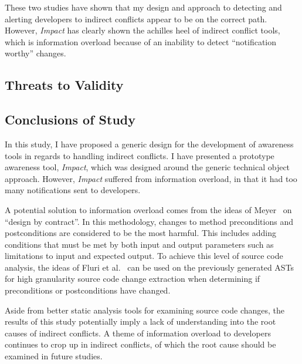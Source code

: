 These two studies have shown that my design and approach to
detecting and alerting developers to indirect conflicts appear
to be on the correct path. However, \textit{Impact} has clearly shown
the achilles heel of indirect conflict tools, which is information
overload because of an inability to detect ``notification worthy''
changes.

\subsection{Threats to Validity}

\subsection{Conclusions of Study}
\label{sec:ns}
In this study, I have proposed a generic 
design for the development of awareness tools in regards to
handling indirect conflicts. I have presented a prototype 
awareness tool, \textit{Impact}, which was designed around the generic 
technical object approach. However, \textit{Impact} suffered from
information overload, in that it had too many notifications sent to
developers.

A potential solution to information overload comes from the ideas of
Meyer~\cite{Meyer:1988} on ``design by contract''. In this methodology, changes to method
preconditions and postconditions are considered to be the most harmful. 
This includes adding conditions that must be met by both input
and output parameters such as limitations to input and expected
output. To achieve this level of source code analysis, the ideas of
Fluri et al.~\cite{Fluri:2007:CDT} can be used on the previously generated
ASTs for high granularity
source code change extraction when determining if preconditions or
postconditions have changed.

Aside from better static analysis tools for examining source code changes,
the results of this study potentially imply a lack of understanding into the
root causes of indirect conflicts.  A theme of information overload to developers
continues to crop up in indirect conflicts, of which the root cause should
be examined in future studies.